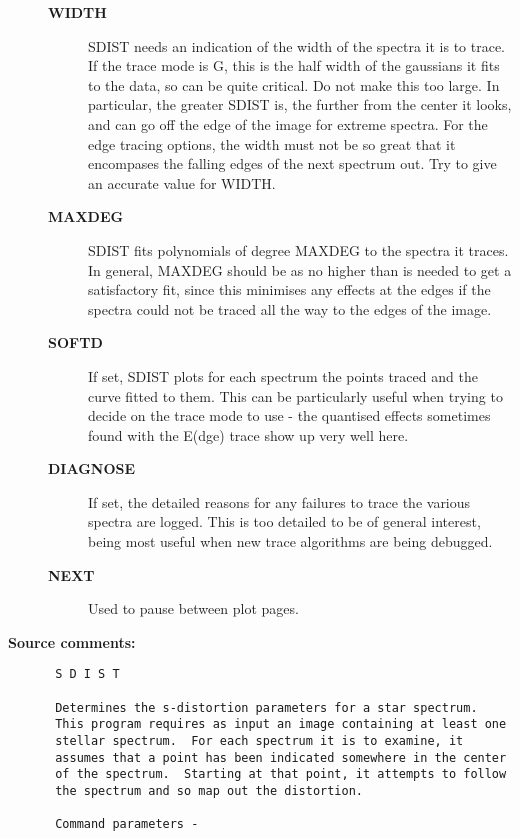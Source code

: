 \begin{description}
\begin{description}
\item [{\bf WIDTH}]
 SDIST needs an indication of the width of the spectra it is to trace.
 If the trace mode is G, this is the half width of the gaussians it
 fits to the data, so can be quite critical.  Do not make this too
 large.  In particular, the greater SDIST is, the further from the
 center it looks, and can go off the edge of the image for extreme
 spectra.  For the edge tracing options, the width must not be so
 great that it encompases the falling edges of the next spectrum out.
 Try to give an accurate value for WIDTH.
\item [{\bf MAXDEG}]
 SDIST fits polynomials of degree MAXDEG to the spectra it traces.  In
 general, MAXDEG should be as no higher than is needed to get a
 satisfactory fit, since this minimises any effects at the edges if
 the spectra could not be traced all the way to the edges of the
 image.
\item [{\bf SOFTD}]
 If set, SDIST plots for each spectrum the points traced and
 the  curve fitted to them.  This can be particularly useful
 when trying to decide on the trace mode to use - the quantised
 effects sometimes found with the E(dge) trace show up very
 well here.
\item [{\bf DIAGNOSE}]
 If set, the detailed reasons for any failures to trace the
 various spectra are logged.  This is too detailed to be of
 general interest, being most useful when new trace algorithms
 are being debugged.
\item [{\bf NEXT}]
 Used to pause between plot pages.
\end{description}

\item [{\bf Source comments:}]
\begin{verbatim}
 S D I S T

 Determines the s-distortion parameters for a star spectrum.
 This program requires as input an image containing at least one
 stellar spectrum.  For each spectrum it is to examine, it
 assumes that a point has been indicated somewhere in the center
 of the spectrum.  Starting at that point, it attempts to follow
 the spectrum and so map out the distortion.

 Command parameters -


\end{verbatim}
\end{description}
